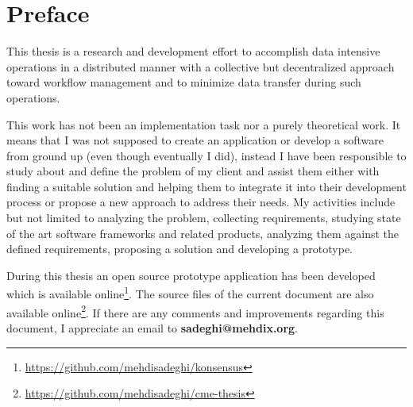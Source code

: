 \chapter*{Preface}
\label{cha:preface}
This thesis is a research and development effort to accomplish data intensive operations in a distributed manner with a 
collective but decentralized approach toward workflow management and to minimize data transfer during such operations.

This work has not been an implementation task nor a purely theoretical work. 
It means that I was not supposed to create an application or develop a software from ground up (even though eventually I did), instead
I have been responsible to study about and define the problem of my client and assist them either with 
finding a suitable solution and helping them to integrate it into their development process or propose a new approach to address their 
needs. My activities include but not limited to analyzing the problem, collecting requirements,
studying state of the art software frameworks and related products,
analyzing them against the defined requirements, proposing a solution and developing a prototype.

During this thesis an open source prototype application has been developed which is available
online\footnote{\url{https://github.com/mehdisadeghi/konsensus}}. The source files
of the current document are also available online\footnote{\url{https://github.com/mehdisadeghi/cme-thesis}}.
If there are any comments and improvements regarding this document, I
appreciate an email to \textbf{sadeghi@mehdix.org}.

